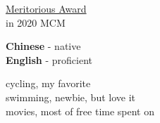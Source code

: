 \documentclass[9pt]{developercv} %
\begin{document}
\begin{minipage}[t]{0.3\textwidth}
	\vspace{-\baselineskip} %

	\href{https://github.com/How-u-doing/Modeling/blob/master/Modeling_programs/2011744.pdf}
	{Meritorious Award}\\ in 2020 MCM
\end{minipage}
\hfill
\begin{minipage}[t]{0.3\textwidth}
	\vspace{-\baselineskip} %


	\textbf{Chinese} - native\\
	\textbf{English} - proficient\\
\end{minipage}
\hfill
\begin{minipage}[t]{0.3\textwidth}
	\vspace{-\baselineskip} %


	cycling, my favorite\\
	swimming, newbie, but love it\\
	movies, most of free time spent on
\end{minipage}
\end{document}
